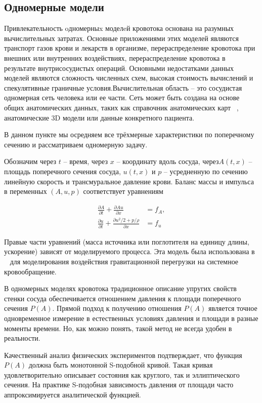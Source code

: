 \subsection{Одномерные модели}

Привлекательность oдномерныx моделeй кровотока основана на разумных вычислительных затратах. Основные приложениями этих моделей являются транспорт газов крови и лекарств в организме, перераспределение кровотока при внешних или внутренних воздействиях, перераспределение кровотока в результате внутрисосудистых операций. Основными недостатками данных моделей являются сложность численных схем, высокая стоимость вычислений и спекулятивные граничные условия.Вычислительная область -- это сосудистая одномерная сеть человека или ее части. Сеть может быть создана на основе общих анатомических данных, таких как справочник анатомических карт ~\cite{bunicheva:2013}, анатомические 3D модели или данные конкретного пациента.

В данном пункте мы осредняем все трёхмерные характеристики по поперечному сечению и рассматриваем одномерную задачу.

Обозначим через $t$ -- время, через $x$ -- координату вдоль сосуда, через$A(t, x)$ -- площадь поперечного сечения сосуда, $u(t, x)$ и $p$ -- усредненную по сечению линейную скорость и трансмуральное давление крови. Баланс массы и импульса в переменных $(A, u, p)$ соответствует уравнениям

\begin{align}
    \label{eq:mass-balance}
    \frac{\partial A}{\partial t}+\frac{\partial Au}{\partial x}&=f_A,\\
    \label{eq:momentum-balance}
    \frac{\partial u}{\partial t}+ \frac{\partial u^2/2+p/\rho}{\partial x}&=f_u
\end{align}

Правые части уравнений (масса источника или поглотителя на единицу длины, ускорение) зависят от моделируемого процесса. Эта модель была использована в ~\cite{bunicheva:2004} для моделирования воздействия гравитационной перегрузки на системное кровообращение. 

В одномерных моделях кровотока традиционное описание упругих свойств стенки сосуда обеспечивается отношением давления к площади поперечного сечения $P(A)$. Прямой подход к получению отношения $P(A)$ является точное одновременное измерение в естественных условиях давления и площади в разные моменты времени. Но, как можно понять, такой метод не всегда удобен в реальности.

Качественный анализ физических экспериментов подтверждает, что функция $P(A)$ должна быть монотонной S-подобной кривой. Такая кривая удовлетворительно описывает  состояния как круглого, так и эллиптического сечения. На практике S-подобная  зависимость давления от площади часто аппроксимируется аналитической функцией. 

